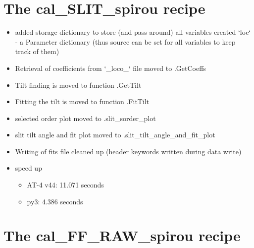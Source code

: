 \section{The cal\_SLIT\_spirou recipe}
\label{ch:changelog:At4:cal_SLIT_spirou}

\begin{itemize}
\item added storage dictionary to store (and pass around) all variables created `loc` - a Parameter dictionary (thus source can be set for all variables to keep track of them)

\item Retrieval of coefficients from `\_loco\_` file moved to \spirouLOCOR.GetCoeffs

\item Tilt finding is moved to function \spirouImage.GetTilt

\item Fitting the tilt is moved to function \spirouImage.FitTilt

\item selected order plot moved to \spirouPlot.slit\_sorder\_plot

\item slit tilt angle and fit plot moved to \spirouPlot.slit\_tilt\_angle\_and\_fit\_plot

\item Writing of fits file cleaned up (header keywords written during data write)

\item speed up
	\begin{itemize}
	\item AT-4 v44: 11.071 seconds
	\item py3: 4.386 seconds
    \end{itemize}

\end{itemize}

\section{The cal\_FF\_RAW\_spirou recipe}
\label{ch:changelog:At4:cal_FF_RAW_spirou}

